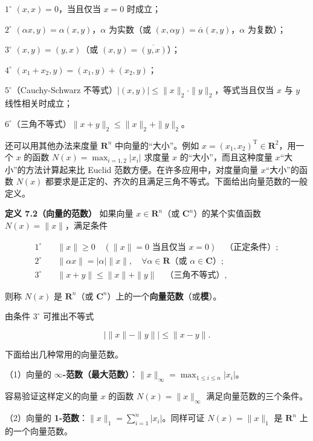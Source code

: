 \documentclass[
  10pt,
  fontset=fandol]{ctexart}
\begin{document}
\(1^\circ\) \((x,x)=0\)，当且仅当 \(x=0\) 时成立；

\(2^\circ\) \((\alpha x,y)=\alpha(x,y)\)，\(\alpha\) 为实数（或 \((x,\alpha y)=\overline\alpha(x,y)\)，\(\alpha\) 为复数）；

\(3^\circ\) \((x,y)=(y,x)\)（或 \((x,y)=\overline{(y,x)}\)）；

\(4^\circ\) \((x_1+x_2,y)=(x_1,y)+(x_2,y)\)；

\(5^\circ\)（Cauchy-Schwarz 不等式）\(|(x,y)|\leqslant\|x\|_2\cdot\|y\|_2\)，等式当且仅当 \(x\) 与 \(y\) 线性相关时成立；

\(6^\circ\)（三角不等式）\(\|x+y\|_2\leqslant\|x\|_2+\|y\|_2\)。

还可以用其他办法来度量 \(\mathbf R^n\) 中向量的``大小''。例如 \(x=(x_1,x_2)^{\mathrm T}\in\mathbf R^2\)，用一个 \(x\) 的函数 \(N(x)=\max_{i=1,2}|x_i|\) 求度量 \(x\) 的``大小''，而且这种度量 \(x\)``大小''的方法计算起来比 Euclid 范数方便。在许多应用中，对度量向量 \(x\)``大小''的函数 \(N(x)\) 都要求是正定的、齐次的且满足三角不等式。下面给出向量范数的一般定义。

\textbf{定义 7.2（向量的范数）} 如果向量 \(x\in\mathbf R^n\)（或 \(\mathbf C^n\)）的某个实值函数 \(N(x)=\|x\|\)，满足条件

\[
\begin{aligned}
1^\circ\quad &\|x\|\geqslant0\quad(\|x\|=0\text{ 当且仅当 }x=0)\quad\text{（正定条件）};\\
2^\circ\quad &\|\alpha x\|=|\alpha|\|x\|,\quad\forall\alpha\in\mathbf R\text{（或 }\alpha\in\mathbf C\text{）};\\
3^\circ\quad &\|x+y\|\leqslant\|x\|+\|y\|\quad\text{（三角不等式）},
\end{aligned}
\tag{7.5.1}
\]

则称 \(N(x)\) 是 \(\mathbf R^n\)（或 \(\mathbf C^n\)）上的一个\textbf{向量范数}（或\textbf{模}）。

由条件 \(3^\circ\) 可推出不等式

\[
\big|\|x\|-\|y\|\big|\leqslant\|x-y\|.
\tag{7.5.2}
\]

下面给出几种常用的向量范数。

（1）向量的 \textbf{\(\infty\)-范数（最大范数）}：\(\|x\|_\infty=\max_{1\leqslant i\leqslant n}|x_i|\)。

容易验证这样定义的向量 \(x\) 的函数 \(N(x)=\|x\|_\infty\) 满足向量范数的三个条件。

（2）向量的 \textbf{1-范数}：\(\|x\|_1=\sum_{i=1}^{n}|x_i|\)。同样可证 \(N(x)=\|x\|_1\) 是 \(\mathbf R^n\) 上的一个向量范数。
\end{document}
